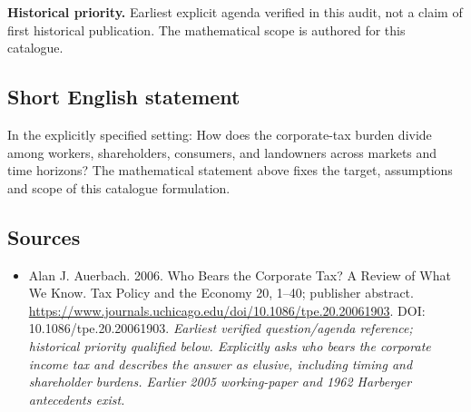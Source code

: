 \documentclass[11pt]{article}
\begin{document}
\par\textbf{Historical priority.} Earliest explicit agenda verified in this audit, not a claim of first historical publication. The mathematical scope is authored for this catalogue.

\subsection{Short English statement}
In the explicitly specified setting: How does the corporate-tax burden divide among workers, shareholders, consumers, and landowners across markets and time horizons? The mathematical statement above fixes the target, assumptions and scope of this catalogue formulation.

\subsection{Sources}
\begin{itemize}\raggedright
\item[\textnormal{[S1]}]\hypertarget{source:30007756:1}{} Alan J. Auerbach. 2006. Who Bears the Corporate Tax? A Review of What We Know. Tax Policy and the Economy 20, 1–40; publisher abstract.
\url{https://www.journals.uchicago.edu/doi/10.1086/tpe.20.20061903}.
DOI: 10.1086/tpe.20.20061903.
{\small\textit{Earliest verified question/agenda reference; historical priority qualified below. Explicitly asks who bears the corporate income tax and describes the answer as elusive, including timing and shareholder burdens. Earlier 2005 working-paper and 1962 Harberger antecedents exist.}}
\end{itemize}
\end{document}
